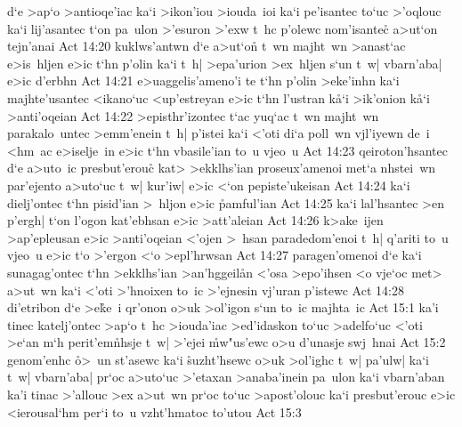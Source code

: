 d`e
>ap`o
>antioqe'iac
ka`i
>ikon'iou
>iouda~ioi
ka`i
pe'isantec
to`uc
>'oqlouc
ka`i
lij'asantec
t`on
pa~ulon
>'esuron
>'exw
t~hc
p'olewc
nom'isantec\r{}
a>ut`on
tejn'anai\bibvsend
\vs Act 14:20
kuklws'antwn
d`e
a>ut`on\r{}
t~wn
majht~wn
>anast`ac
e>is~hljen
e>ic
t`hn
p'olin
ka`i
t~h|
>epa'urion
>ex~hljen
s`un
t~w|
vbarn'aba|
e>ic
d'erbhn\bibvsend
\vs Act 14:21
e>uaggelis'ameno'i
te
t`hn
p'olin
>eke'inhn
ka`i
majhte'usantec
<ikano`uc
<up'estreyan
e>ic
t`hn
l'ustran
k\r{a}`i
>ik'onion
k\r{a}`i
>anti'oqeian\bibvsend
\vs Act 14:22
>episthr'izontec
t`ac
yuq`ac
t~wn
majht~wn
parakalo~untec
>emm'enein
t~h|
p'istei
ka`i
<'oti
di`a
poll~wn
vjl'iyewn
de~i
<hm~ac
e>iselje~in
e>ic
t`hn
vbasile'ian
to~u
vjeo~u\bibvsend
\vs Act 14:23
qeiroton'hsantec
d`e
a>uto~ic
presbut'erouc\r{}
kat>
>ekklhs'ian
proseux'amenoi
met`a
nhstei~wn
par'ejento
a>uto`uc
t~w|
kur'iw|
e>ic
<`on
pepiste'ukeisan\bibvsend
\vs Act 14:24
ka`i
dielj'ontec
t`hn
pisid'ian
>~hljon
e>ic
\r{p}amful'ian\bibvsend
{}
\vs Act 14:25
ka`i
lal'hsantec
>en
p'ergh|
t`on
l'ogon
kat'ebhsan
e>ic
>att'aleian\bibvsend
\vs Act 14:26
k>ake~ijen
>ap'epleusan
e>ic
>anti'oqeian
<'ojen
>~hsan
paradedom'enoi
t~h|
q'ariti
to~u
vjeo~u
e>ic
t`o
>'ergon
<`o
>epl'hrwsan\bibvsend
\vs Act 14:27
paragen'omenoi
d`e
ka`i
sunagag'ontec
t`hn
>ekklhs'ian
>an'hggeil\r{a}n
<'osa
>epo'ihsen
<o
vje`oc
met>
a>ut~wn
ka`i
<'oti
>'hnoixen
to~ic
>'ejnesin
vj'uran
p'istewc\bibvsend
\vs Act 14:28
di'etribon
d`e
>e\r{k}e~i
qr'onon
o>uk
>ol'igon
s`un
to~ic
majhta~ic\bibvsend
\vs Act 15:1
ka'i
tinec
katelj'ontec
>ap`o
t~hc
>iouda'iac
>ed'idaskon
to`uc
>adelfo`uc
<'oti
>e`an
m`h
perit'em\r{n}hsje
t~w|
>'ejei
\r{m}w"us'ewc
o>u
d'unasje
swj~hnai\bibvsend
\vs Act 15:2
genom'enhc
\r{o}>~un
st'asewc
ka`i
\r{s}uzht'hsewc
o>uk
>ol'ighc
t~w|
pa'ulw|
ka`i
t~w|
vbarn'aba|
pr`oc
a>uto`uc
>'etaxan
>anaba'inein
pa~ulon
ka`i
vbarn'aban
ka'i
tinac
>'allouc
>ex
a>ut~wn
pr`oc
to`uc
>apost'olouc
ka`i
presbut'erouc
e>ic
<ierousal`hm
per`i
to~u
vzht'hmatoc
to'utou\bibvsend
\vs Act 15:3
